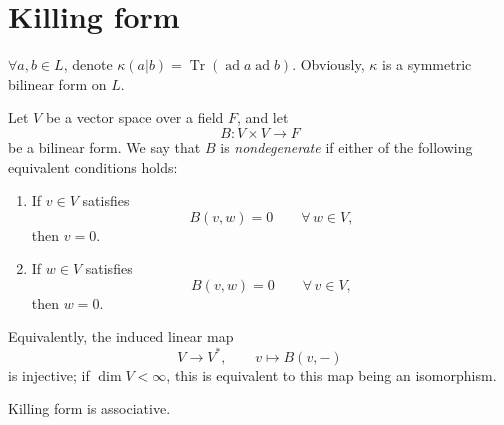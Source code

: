 \section{Killing form}

$\forall a,b \in L$, denote $\kappa(a|b)=\operatorname{Tr}(\operatorname{ad}a \operatorname{ad}b)$. Obviously, $\kappa$ is a symmetric bilinear form on $L$.

\begin{definition}
    Let $V$ be a vector space over a field $F$, and let
    \[
        B: V \times V \to F
    \]
    be a bilinear form. We say that $B$ is \emph{nondegenerate} if either of the following equivalent conditions holds:
    \begin{enumerate}
        \item If $v \in V$ satisfies
              \[
                  B(v,w)=0 \qquad \forall\, w\in V,
              \]
              then $v=0$.
        \item If $w \in V$ satisfies
              \[
                  B(v,w)=0 \qquad \forall\, v\in V,
              \]
              then $w=0$.
    \end{enumerate}
    Equivalently, the induced linear map
    \[
        V \to V^*, \qquad v \mapsto B(v,-)
    \]
    is injective; if $\dim V<\infty$, this is equivalent to this map being an isomorphism.
\end{definition}

\begin{proposition}
    Killing form is associative.
\end{proposition}

